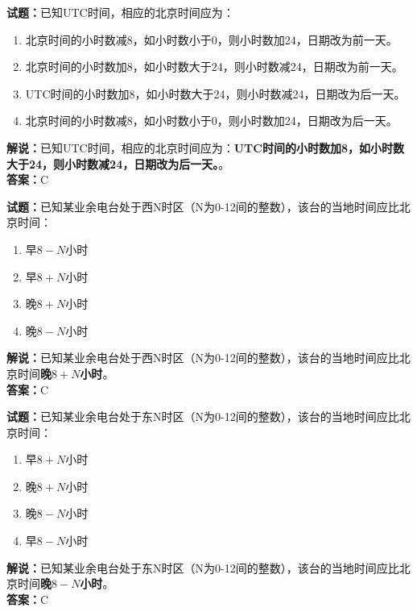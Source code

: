 \documentclass{ctexbook}
\begin{document}
\bigskip


\noindent\textbf{试题：}已知UTC时间，相应的北京时间应为：
\begin{enumerate}[leftmargin=3em]
\item 北京时间的小时数减8，如小时数小于0，则小时数加24，日期改为前一天。
\item 北京时间的小时数加8，如小时数大于24，则小时数减24，日期改为前一天。
\item UTC时间的小时数加8，如小时数大于24，则小时数减24，日期改为后一天。
\item 北京时间的小时数减8，如小时数小于0，则小时数加24，日期改为后一天。
\end{enumerate}
\noindent\textbf{解说：}已知UTC时间，相应的北京时间应为：\textbf{UTC时间的小时数加8，如小时数大于24，则小时数减24，日期改为后一天。}。\\\noindent\textbf{答案：}C


\bigskip


\noindent\textbf{试题：}已知某业余电台处于西N时区（N为0-12间的整数），该台的当地时间应比北京时间：
\begin{enumerate}[leftmargin=3em]
\item 早\(8-N\)小时
\item 早\(8+N\)小时
\item 晚\(8+N\)小时
\item 晚\(8-N\)小时
\end{enumerate}
\noindent\textbf{解说：}已知某业余电台处于西N时区（N为0-12间的整数），该台的当地时间应比北京时间\textbf{晚\(8+N\)小时}。\\\noindent\textbf{答案：}C




\bigskip


\noindent\textbf{试题：}已知某业余电台处于东N时区（N为0-12间的整数），该台的当地时间应比北京时间：
\begin{enumerate}[leftmargin=3em]
\item 早\(8+N\)小时
\item 晚\(8+N\)小时
\item 晚\(8-N\)小时
\item 早\(8-N\)小时
\end{enumerate}
\noindent\textbf{解说：}已知某业余电台处于东N时区（N为0-12间的整数），该台的当地时间应比北京时间\textbf{晚\(8-N\)小时}。\\\noindent\textbf{答案：}C



\bigskip
\end{document}
